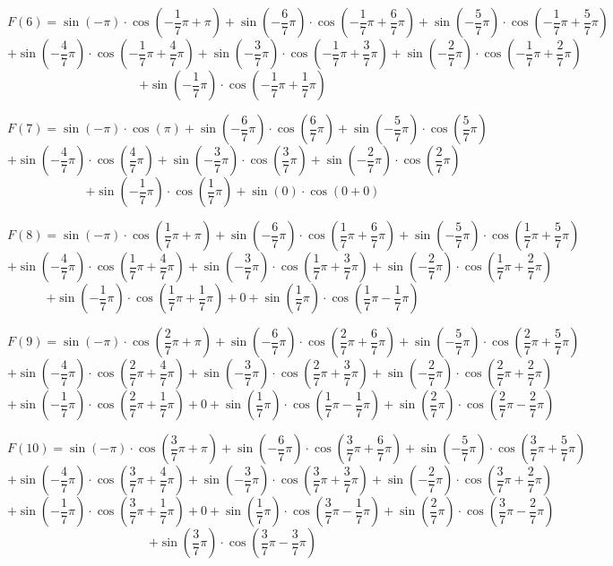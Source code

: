 \documentclass[11pt]{article}
\begin{document}
\[F(6) = \sin(-\pi)\cdot\cos(-\frac{1}{7}\pi + \pi) + \sin(-\frac{6}{7}\pi)\cdot\cos(-\frac{1}{7}\pi + \frac{6}{7}\pi) + \sin(-\frac{5}{7}\pi)\cdot\cos(-\frac{1}{7}\pi + \frac{5}{7}\pi)\] \[+ \sin(-\frac{4}{7}\pi)\cdot\cos(-\frac{1}{7}\pi + \frac{4}{7}\pi) + \sin(-\frac{3}{7}\pi)\cdot\cos(-\frac{1}{7}\pi + \frac{3}{7}\pi) + \sin(-\frac{2}{7}\pi)\cdot\cos(-\frac{1}{7}\pi + \frac{2}{7}\pi)\]\[ + \sin(-\frac{1}{7}\pi)\cdot\cos(-\frac{1}{7}\pi + \frac{1}{7}\pi)\]

\[F(7) = \sin(-\pi)\cdot\cos(\pi) + \sin(-\frac{6}{7}\pi)\cdot\cos(\frac{6}{7}\pi) + \sin(-\frac{5}{7}\pi)\cdot\cos(\frac{5}{7}\pi)\] \[+ \sin(-\frac{4}{7}\pi)\cdot\cos(\frac{4}{7}\pi) + \sin(-\frac{3}{7}\pi)\cdot\cos(\frac{3}{7}\pi) + \sin(-\frac{2}{7}\pi)\cdot\cos(\frac{2}{7}\pi)\]\[ + \sin(-\frac{1}{7}\pi)\cdot\cos(\frac{1}{7}\pi) + \sin(0)\cdot\cos(0 + 0)\]

\[F(8) = \sin(-\pi)\cdot\cos(\frac{1}{7}\pi + \pi) + \sin(-\frac{6}{7}\pi)\cdot\cos(\frac{1}{7}\pi + \frac{6}{7}\pi) + \sin(-\frac{5}{7}\pi)\cdot\cos(\frac{1}{7}\pi + \frac{5}{7}\pi)\] \[+ \sin(-\frac{4}{7}\pi)\cdot\cos(\frac{1}{7}\pi + \frac{4}{7}\pi) + \sin(-\frac{3}{7}\pi)\cdot\cos(\frac{1}{7}\pi + \frac{3}{7}\pi) + \sin(-\frac{2}{7}\pi)\cdot\cos(\frac{1}{7}\pi + \frac{2}{7}\pi)\]\[ + \sin(-\frac{1}{7}\pi)\cdot\cos(\frac{1}{7}\pi + \frac{1}{7}\pi) + 0 + \sin(\frac{1}{7}\pi)\cdot\cos(\frac{1}{7}\pi - \frac{1}{7}\pi)\]

\[F(9) = \sin(-\pi)\cdot\cos(\frac{2}{7}\pi + \pi) + \sin(-\frac{6}{7}\pi)\cdot\cos(\frac{2}{7}\pi + \frac{6}{7}\pi) + \sin(-\frac{5}{7}\pi)\cdot\cos(\frac{2}{7}\pi + \frac{5}{7}\pi)\] \[+ \sin(-\frac{4}{7}\pi)\cdot\cos(\frac{2}{7}\pi + \frac{4}{7}\pi) + \sin(-\frac{3}{7}\pi)\cdot\cos(\frac{2}{7}\pi + \frac{3}{7}\pi) + \sin(-\frac{2}{7}\pi)\cdot\cos(\frac{2}{7}\pi + \frac{2}{7}\pi)\]\[ + \sin(-\frac{1}{7}\pi)\cdot\cos(\frac{2}{7}\pi + \frac{1}{7}\pi) + 0 + \sin(\frac{1}{7}\pi)\cdot\cos(\frac{1}{7}\pi - \frac{1}{7}\pi)  + \sin(\frac{2}{7}\pi)\cdot\cos(\frac{2}{7}\pi - \frac{2}{7}\pi)\]

\[F(10) = \sin(-\pi)\cdot\cos(\frac{3}{7}\pi + \pi) + \sin(-\frac{6}{7}\pi)\cdot\cos(\frac{3}{7}\pi + \frac{6}{7}\pi) + \sin(-\frac{5}{7}\pi)\cdot\cos(\frac{3}{7}\pi + \frac{5}{7}\pi)\] \[+ \sin(-\frac{4}{7}\pi)\cdot\cos(\frac{3}{7}\pi + \frac{4}{7}\pi) + \sin(-\frac{3}{7}\pi)\cdot\cos(\frac{3}{7}\pi + \frac{3}{7}\pi) + \sin(-\frac{2}{7}\pi)\cdot\cos(\frac{3}{7}\pi + \frac{2}{7}\pi)\]\[ + \sin(-\frac{1}{7}\pi)\cdot\cos(\frac{3}{7}\pi + \frac{1}{7}\pi) + 0 + \sin(\frac{1}{7}\pi)\cdot\cos(\frac{3}{7}\pi - \frac{1}{7}\pi)  + \sin(\frac{2}{7}\pi)\cdot\cos(\frac{3}{7}\pi - \frac{2}{7}\pi)\]
\[ + \sin(\frac{3}{7}\pi)\cdot\cos(\frac{3}{7}\pi - \frac{3}{7}\pi)\]
\end{document}
